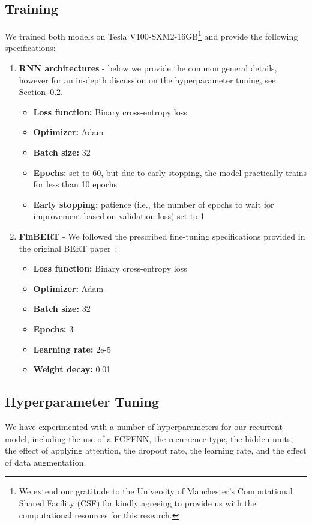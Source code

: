 \subsection{Training}\label{subsec:training}
We trained both models on Tesla V100-SXM2-16GB\footnote{
    We extend our gratitude to the University of Manchester's Computational Shared Facility (CSF) for kindly agreeing to provide us with the computational resources for this research.
} and provide the following specifications:
\begin{enumerate}
    \item \textbf{RNN architectures} - below we provide the common general details, however for an in-depth discussion on the hyperparameter tuning, see Section~\ref{subsec:hyperparameters}.
        \begin{itemize}
            \item \textbf{Loss function:} Binary cross-entropy loss
            \item \textbf{Optimizer:} Adam~\cite{kingma2017adam}
            \item \textbf{Batch size:} 32
            \item \textbf{Epochs:} set to 60, but due to early stopping, the model practically trains for less than 10 epochs
            \item \textbf{Early stopping:} patience (i.e., the number of epochs to wait for improvement based on validation loss) set to 1
        \end{itemize}
    \item \textbf{FinBERT} - We followed the prescribed fine-tuning specifications provided in the original BERT paper~\cite{devlin-etal-2019-bert}:
        \begin{itemize}
            \item \textbf{Loss function:} Binary cross-entropy loss
            \item \textbf{Optimizer:} Adam~\cite{kingma2017adam}
            \item \textbf{Batch size:} 32
            \item \textbf{Epochs:} 3
            \item \textbf{Learning rate:} 2e-5
            \item \textbf{Weight decay:} 0.01
        \end{itemize}
\end{enumerate}


\subsection{Hyperparameter Tuning}\label{subsec:hyperparameters}
We have experimented with a number of hyperparameters for our recurrent model, including the use of a FCFFNN,
the recurrence type, the hidden units, the effect of applying attention, the dropout rate, the learning rate, and the effect of data augmentation.


